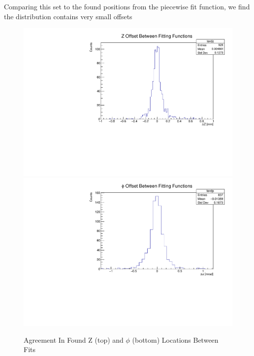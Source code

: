 Comparing this set to the found positions from the piecewise fit function, we find the distribution contains very small offsets

\begin{figure}[h]
    \centering
    \includegraphics[width=.7\linewidth]{graphics/terdzhc.pdf}
    \includegraphics[width=.7\linewidth]{graphics/terdphc.pdf}
    \caption{Agreement In Found Z (top) and $\phi$ (bottom) Locations Between Fits}
    \label{fig:fitcompare}
\end{figure}

